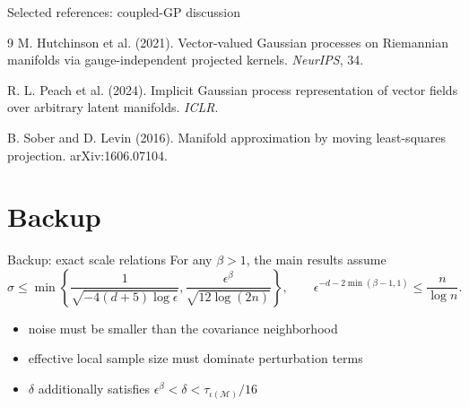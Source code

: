 \documentclass[aspectratio=169,10pt]{beamer}
\newcommand{\M}{\mathcal M}
\begin{document}
\begin{frame}{Selected references: coupled-GP discussion}
  \small
  \begin{thebibliography}{9}
      M. Hutchinson et al. (2021).
      \newblock Vector-valued Gaussian processes on Riemannian manifolds via
      gauge-independent projected kernels.
      \newblock \emph{NeurIPS}, 34.

      R. L. Peach et al. (2024).
      \newblock Implicit Gaussian process representation of vector fields
      over arbitrary latent manifolds.
      \newblock \emph{ICLR}.

      B. Sober and D. Levin (2016).
      \newblock Manifold approximation by moving least-squares projection.
      \newblock arXiv:1606.07104.
  \end{thebibliography}
\end{frame}

\appendix
\section{Backup}

\begin{frame}{Backup: exact scale relations}
  For any \(\beta>1\), the main results assume
  \[
    \sigma\leq
    \min\!\left\{
      \frac{1}{\sqrt{-4(d+5)\log\epsilon}},
      \frac{\epsilon^\beta}{\sqrt{12\log(2n)}}
    \right\},
    \qquad
    \epsilon^{-d-2\min(\beta-1,1)}
      \leq \frac{n}{\log n}.
  \]
  \begin{itemize}
    \item noise must be smaller than the covariance neighborhood
    \item effective local sample size must dominate perturbation terms
    \item \(\delta\) additionally satisfies
      \(\epsilon^\beta<\delta<\tau_{\iota(\M)}/16\)
  \end{itemize}
\end{frame}
\end{document}

